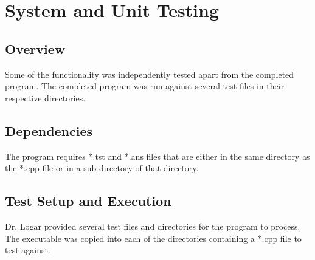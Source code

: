 
\chapter{System  and Unit Testing}



\section{Overview}
Some of the functionality was independently tested apart from the completed program.
The completed program was run against several test files in their respective directories.



\section{Dependencies}
The program requires *.tst and *.ans files that are either in the same directory as the *.cpp file or in
a sub-directory of that directory.


\section{Test Setup and Execution}
Dr. Logar provided several test files and directories for the program to process. The executable was copied into each
of the directories containing a *.cpp file to test against.

